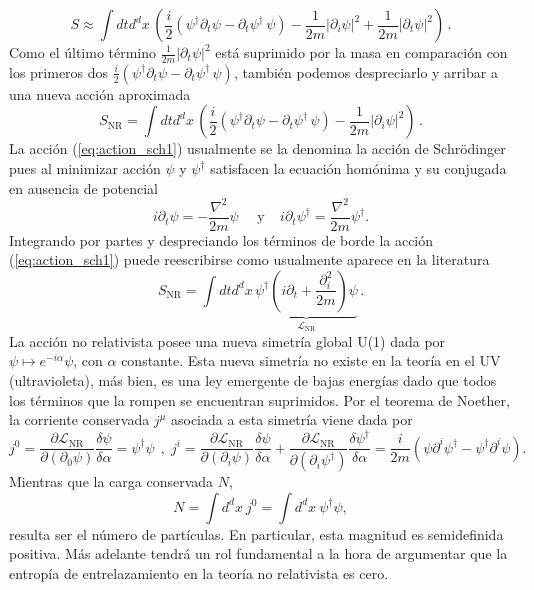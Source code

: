 \begin{equation}
S\approx \int dt d^dx\,\left (\frac{i}{2} (\psi^\dag \partial_t \psi - \partial_t \psi^\dag\,\psi)- \frac{1}{2m}|\partial_i \psi|^2+\frac{1}{2m} |\partial_t \psi|^2 \right)\,.
\end{equation}
Como el último término $\frac{1}{2m} |\partial_t \psi|^2$ está suprimido por la masa en comparación con los primeros dos $\frac{i}{2} (\psi^\dag \partial_t \psi - \partial_t \psi^\dag\,\psi)$, también podemos despreciarlo y arribar a una nueva acción aproximada
\begin{equation}
S_{\text{NR}} = \int dt d^dx\,\left (\frac{i}{2} (\psi^\dag \partial_t \psi - \partial_t \psi^\dag\,\psi)- \frac{1}{2m}|\partial_i \psi|^2 \right)\,.
\label{eq:action_sch1}
\end{equation}
La acción (\ref{eq:action_sch1}) usualmente se la denomina la acción de Schr\"{o}dinger pues al minimizar acción $\psi$ y $\psi^{\dag}
$ satisfacen la ecuación homónima y su conjugada en ausencia de potencial
\begin{equation}
i\partial_t \psi=-\frac{\nabla^2}{2m}\psi \:\:\:\:\:\: \text{y} \:\:\:\:\: i\partial_t \psi^{\dag}=\frac{\nabla^2}{2m}\psi^{\dag}. 
\end{equation}
Integrando por partes y despreciando los términos de borde la acción (\ref{eq:action_sch1}) puede reescribirse como usualmente aparece en la literatura
\begin{equation}
S_{\text{NR}}=\int dt d^dx\,\underbrace{\psi^\dag \left(i\partial_t +\frac{\partial_i^2}{2m}   \right)\psi}_{\mathcal{L}_{\text{NR}}} \,  .
\end{equation}
La acción no relativista posee una nueva simetría global U(1) dada por $\psi \mapsto e^{-i\alpha}\psi$, con $\alpha$ constante. Esta nueva simetría no existe en la teoría en el UV (ultravioleta), más bien, es una ley emergente de bajas energías dado que todos los términos que la rompen se encuentran suprimidos. Por el teorema de Noether, la corriente conservada $j^{\mu}$ asociada a esta simetría viene dada por
\begin{equation}
j^{0}=\frac{\partial \mathcal{L}_{\text{NR}}}{\partial(\partial_{0}\psi)}\frac{\delta \psi }{\delta \alpha}=\psi^{\dag}\psi \:\: \text{,}\:\: j^{i}=\frac{\partial \mathcal{L}_{\text{NR}}}{\partial(\partial_{i}\psi)}\frac{\delta \psi }{\delta \alpha}+\frac{\partial \mathcal{L}_{\text{NR}}}{\partial(\partial_{i}\psi^{\dag})}\frac{\delta \psi^{\dag} }{\delta \alpha}=\frac{i}{2m}(\psi \partial^i \psi^{\dag}- \psi^{\dag}\partial^i \psi).
\end{equation}
Mientras que la carga conservada $N$,
\begin{equation}
N=\int d^dx \:j^0=\int d^dx \:\psi^{\dag}\psi,
\end{equation}
resulta ser el número de partículas. En particular, esta magnitud es semidefinida positiva. Más adelante tendrá un rol fundamental a la hora de argumentar que la entropía de entrelazamiento en la teoría no relativista es cero.\\


